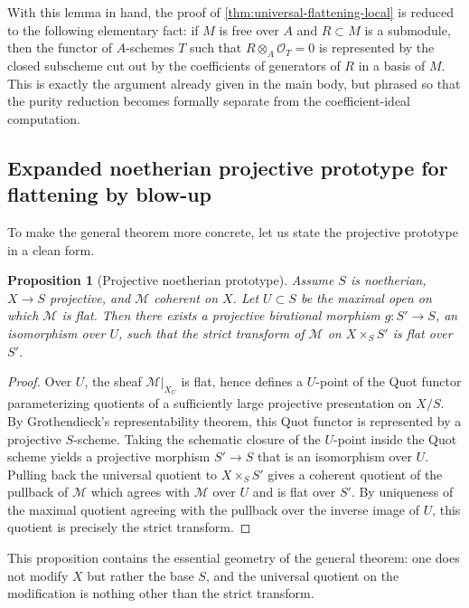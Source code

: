 \documentclass[11pt,oneside]{article}
\newtheorem{proposition}[theorem]{Proposition}
\newcommand{\M}{\mathcal M}
\newcommand{\OO}{\mathcal O}
\begin{document}
With this lemma in hand, the proof of \cref{thm:universal-flattening-local} is reduced to the following elementary fact: if $M$ is free over $A$ and $R\subset M$ is a submodule, then the functor of $A$-schemes $T$ such that $R\otimes_A \OO_T=0$ is represented by the closed subscheme cut out by the coefficients of generators of $R$ in a basis of $M$.  This is exactly the argument already given in the main body, but phrased so that the purity reduction becomes formally separate from the coefficient-ideal computation.

\subsection{Expanded noetherian projective prototype for flattening by blow-up}

To make the general theorem more concrete, let us state the projective prototype in a clean form.

\begin{proposition}[Projective noetherian prototype]\label{prop:quot-prototype}
Assume $S$ is noetherian, $X\to S$ projective, and $\M$ coherent on $X$.  Let $U\subset S$ be the maximal open on which $\M$ is flat.  Then there exists a projective birational morphism $g\colon S'\to S$, an isomorphism over $U$, such that the strict transform of $\M$ on $X\times_S S'$ is flat over $S'$.
\end{proposition}

\begin{proof}
Over $U$, the sheaf $\M|_{X_U}$ is flat, hence defines a $U$-point of the Quot functor parameterizing quotients of a sufficiently large projective presentation on $X/S$.  By Grothendieck's representability theorem, this Quot functor is represented by a projective $S$-scheme.  Taking the schematic closure of the $U$-point inside the Quot scheme yields a projective morphism $S'\to S$ that is an isomorphism over $U$.  Pulling back the universal quotient to $X\times_S S'$ gives a coherent quotient of the pullback of $\M$ which agrees with $\M$ over $U$ and is flat over $S'$.  By uniqueness of the maximal quotient agreeing with the pullback over the inverse image of $U$, this quotient is precisely the strict transform.
\end{proof}

This proposition contains the essential geometry of the general theorem: one does not modify $X$ but rather the base $S$, and the universal quotient on the modification is nothing other than the strict transform.
\end{document}

